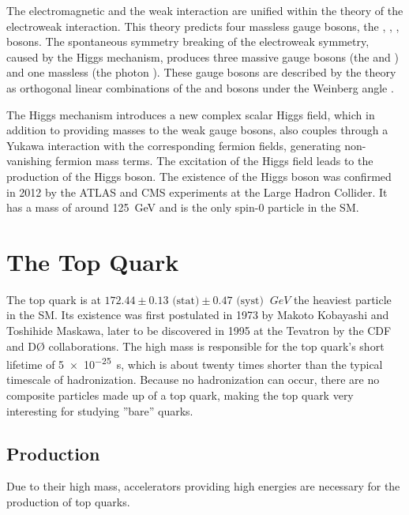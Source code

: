 The electromagnetic and the weak interaction are unified within the theory of the electroweak interaction. This theory predicts four massless gauge bosons, the \PBzero, \PWzero, \PWone, \PWtwo bosons. The spontaneous symmetry breaking of the electroweak symmetry, caused by the Higgs mechanism, produces three massive gauge bosons (the \PZzero and \PWpm) and one massless (the photon \Pphoton). These gauge bosons are described by the theory as orthogonal linear combinations of the \PBzero and \PWzero bosons under the Weinberg angle \cite{wiki:electroweak}.

The Higgs mechanism introduces a new complex scalar Higgs field, which in addition to providing masses to the weak gauge bosons, also couples through a Yukawa interaction with the corresponding fermion fields, generating non-vanishing fermion mass terms. The excitation of the Higgs field leads to the production of the Higgs boson. The existence of the Higgs boson was confirmed in 2012 by the ATLAS and CMS experiments at the Large Hadron Collider. It has a mass of around \SI{125}{\giga\eV} \cite{Cha12} and is the only spin-0 particle in the SM.

\section{The Top Quark}
\label{sec:theory_top}
The top quark is at $172.44 \pm 0.13 \text{ (stat)} \pm 0.47 \text{ (syst) }\SI{}{GeV}$ \cite{ACCC14} the heaviest particle in the SM. Its existence was first postulated in 1973 by Makoto Kobayashi and Toshihide Maskawa, later to be discovered in 1995 at the Tevatron by the CDF and D\O{} collaborations. The high mass is responsible for the top quark's short lifetime of \SI{5e-25}{s}, which is about twenty times shorter than the typical timescale of hadronization. Because no hadronization can occur, there are no composite particles made up of a top quark, making the top quark very interesting for studying ''bare'' quarks.

\subsection{Production}
Due to their high mass, accelerators providing high energies are necessary for the production of top quarks. 

